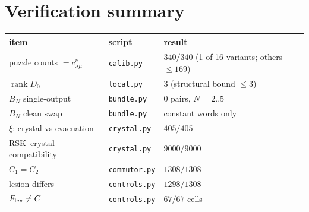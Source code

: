 \documentclass[11pt]{article}
\theoremstyle{definition}
\theoremstyle{remark}
\begin{document}
\section{Verification summary}
\begin{tabular}{@{}lll@{}}\toprule
item & script & result\\\midrule
puzzle counts $=c^\nu_{\lambda\mu}$ & \texttt{calib.py} & $340/340$ (1 of 16 variants; others $\le169$)\\
$\operatorname{rank}D_0$ & \texttt{local.py} & $3$ (structural bound $\le3$)\\
$B_N$ single-output & \texttt{bundle.py} & $0$ pairs, $N=2..5$\\
$B_N$ clean swap & \texttt{bundle.py} & constant words only\\
$\xi$: crystal vs evacuation & \texttt{crystal.py} & $405/405$\\
RSK--crystal compatibility & \texttt{crystal.py} & $9000/9000$\\
$C_1=C_2$ & \texttt{commutor.py} & $1308/1308$\\
lesion differs & \texttt{controls.py} & $1298/1308$\\
$F_{\rm lex}\ne C$ & \texttt{controls.py} & $67/67$ cells\\\bottomrule
\end{tabular}
\end{document}
